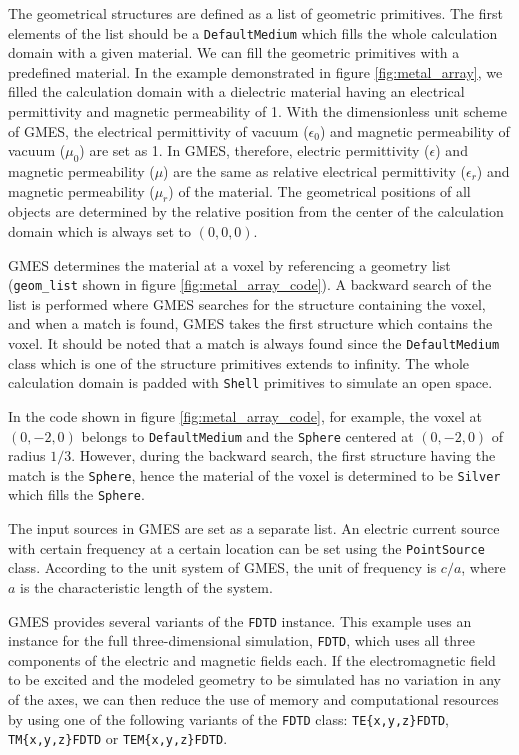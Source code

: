 The geometrical structures are defined as a list of geometric primitives. The first elements of the list should be a \texttt{DefaultMedium} which fills the whole calculation domain with a given material. We can fill the geometric primitives with a predefined material. In the example demonstrated in figure \ref{fig:metal_array}, we filled the calculation domain with a dielectric material having an electrical permittivity and magnetic permeability of 1. With the dimensionless unit scheme of GMES, the electrical permittivity of vacuum ($\epsilon_0$) and magnetic permeability of vacuum ($\mu_0$) are set as 1. In GMES, therefore, electric permittivity ($\epsilon$) and magnetic permeability ($\mu$) are the same as relative electrical permittivity ($\epsilon_r$) and magnetic permeability ($\mu_r$) of the material. The geometrical positions of all objects are determined by the relative position from the center of the calculation domain which is always set to $(0,0,0)$. 

GMES determines the material at a voxel by referencing a geometry list (\texttt{geom\_list} shown in figure \ref{fig:metal_array_code}). A backward search of the list is performed where GMES searches for the structure containing the voxel, and when a match is found, GMES takes the first structure which contains the voxel. It should be noted that a match is always found since the \texttt{DefaultMedium} class which is one of the structure primitives extends to infinity. The whole calculation domain is padded with \texttt{Shell} primitives to simulate an open space. 

In the code shown in figure \ref{fig:metal_array_code}, for example, the voxel at $(0,-2,0)$ belongs to \texttt{DefaultMedium} and the \texttt{Sphere} centered at $(0,-2,0)$ of radius $1/3$. However, during the backward search, the first structure having the match is the \texttt{Sphere}, hence the material of the voxel is determined to be \texttt{Silver} which fills the \texttt{Sphere}.

The input sources in GMES are set as a separate list. An electric current source with certain frequency at a certain location can be set using the \texttt{PointSource} class. According to the unit system of GMES, the unit of frequency is $c/a$, where $a$ is the characteristic length of the system.

GMES provides several variants of the \texttt{FDTD} instance. This example uses an instance for the full three-dimensional simulation, \texttt{FDTD}, which uses all three components of the electric and magnetic fields each. If the electromagnetic field to be excited and the modeled geometry to be simulated has no variation in any of the axes, we can then reduce the use of memory and computational resources by using one of the following variants of the \texttt{FDTD} class: \texttt{TE\{x,y,z\}FDTD}, \texttt{TM\{x,y,z\}FDTD} or \texttt{TEM\{x,y,z\}FDTD}.

